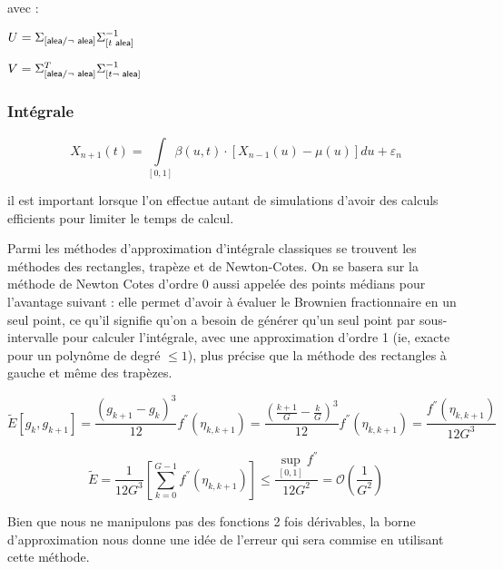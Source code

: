 avec : 

$U = \Sigma_{[\textsf{alea} / \neg \textsf{ alea}]} \Sigma_{[t \textsf{ alea}]} ^ {-1} $

$V = \Sigma^T_{[\textsf{alea} / \neg \textsf{ alea}]} \Sigma_{[t \neg\textsf{ alea}]} ^ {-1}$

\subsubsection{Intégrale}

$$X_{n+1}(t) = \int\limits_{[0,1]} \beta(u,t) \cdot \left[ X_{n-1}(u) - \mu(u)\right]du + \varepsilon_n$$

il est important lorsque l'on effectue autant de simulations d'avoir des calculs efficients pour limiter le temps de calcul.

Parmi les méthodes d'approximation d'intégrale classiques se trouvent les méthodes des rectangles, trapèze et de Newton-Cotes. On se basera sur la méthode de Newton Cotes d'ordre 0 aussi appelée des points médians pour l'avantage suivant : elle permet d'avoir à évaluer le Brownien fractionnaire en un seul point, ce qu'il signifie qu'on a besoin de générer qu'un seul point par sous-intervalle pour calculer l'intégrale, avec une approximation d'ordre 1 (ie, exacte pour un polynôme de degré $\leq 1$), plus précise que la méthode des rectangles à gauche et même des trapèzes.

$$\tilde E[g_{k}, g_{k+1}] = \frac{(g_{k+1}-g_k)^3}{12}f ^{''}(\eta_{k,k+1}) = \frac{(\frac{k+1} G - \frac k G )^3}{12}f ^{''}(\eta_{k,k+1}) = \frac{f ^{''}(\eta_{k,k+1})}{12G^3}$$

$$\tilde E = \frac 1 {12 G^3} \left[\sum_{k=0}^{G-1}f ^{''}(\eta_{k, k+1})\right] \leq \frac{\sup\limits_{[0,1]} f^{''} }{12 G^2}= \mathcal O\left( \frac 1 {G^2} \right)$$

Bien que nous ne manipulons pas des fonctions 2 fois dérivables, la borne d'approximation nous donne une idée de l'erreur qui sera commise en utilisant cette méthode.
